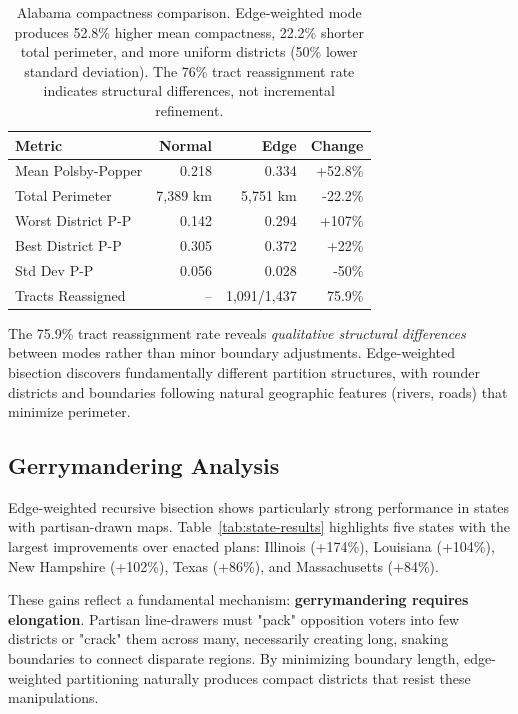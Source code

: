 \begin{table}[h]
\centering
\small
\begin{tabular}{lrrr}
\toprule
\textbf{Metric} & \textbf{Normal} & \textbf{Edge} & \textbf{Change} \\
\midrule
Mean Polsby-Popper & 0.218 & 0.334 & +52.8\% \\
Total Perimeter & 7,389 km & 5,751 km & -22.2\% \\
Worst District P-P & 0.142 & 0.294 & +107\% \\
Best District P-P & 0.305 & 0.372 & +22\% \\
Std Dev P-P & 0.056 & 0.028 & -50\% \\
\midrule
Tracts Reassigned & -- & 1,091/1,437 & 75.9\% \\
\bottomrule
\end{tabular}
\caption{Alabama compactness comparison. Edge-weighted mode produces 52.8\% higher mean compactness, 22.2\% shorter total perimeter, and more uniform districts (50\% lower standard deviation). The 76\% tract reassignment rate indicates structural differences, not incremental refinement.}
\label{tab:alabama}
\end{table}

The 75.9\% tract reassignment rate reveals \textit{qualitative structural differences} between modes rather than minor boundary adjustments. Edge-weighted bisection discovers fundamentally different partition structures, with rounder districts and boundaries following natural geographic features (rivers, roads) that minimize perimeter.

\subsection{Gerrymandering Analysis}

Edge-weighted recursive bisection shows particularly strong performance in states with partisan-drawn maps. Table~\ref{tab:state-results} highlights five states with the largest improvements over enacted plans: Illinois (+174\%), Louisiana (+104\%), New Hampshire (+102\%), Texas (+86\%), and Massachusetts (+84\%).

These gains reflect a fundamental mechanism: \textbf{gerrymandering requires elongation}. Partisan line-drawers must "pack" opposition voters into few districts or "crack" them across many, necessarily creating long, snaking boundaries to connect disparate regions. By minimizing boundary length, edge-weighted partitioning naturally produces compact districts that resist these manipulations.

